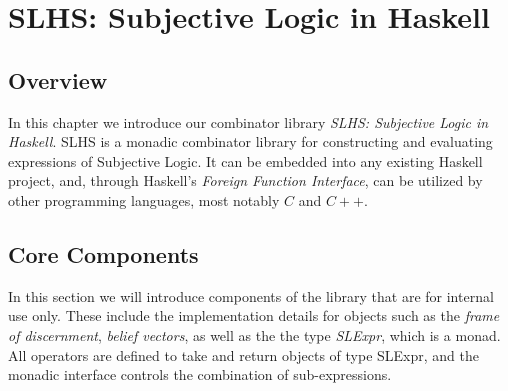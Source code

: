 \documentclass[thesis.tex]{subfiles}
\begin{document}
\chapter{SLHS: Subjective Logic in Haskell}


\section{Overview}

In this chapter we introduce our combinator library \emph{SLHS:
  Subjective Logic in Haskell}. SLHS is a monadic combinator library
for constructing and evaluating expressions of Subjective Logic. It
can be embedded into any existing Haskell project, and, through
Haskell's \emph{Foreign Function Interface}, can be utilized by other
programming languages, most notably $C$ and $C++$.


\section{Core Components}

In this section we will introduce components of the library that
are for internal use only. These include the implementation details
for objects such as the \emph{frame of discernment}, \emph{belief
  vectors}, as well as the the type \emph{SLExpr}, which is a monad.
All operators are defined to take and return objects of type
SLExpr, and the monadic interface controls the combination of
sub-expressions.







\end{document}
